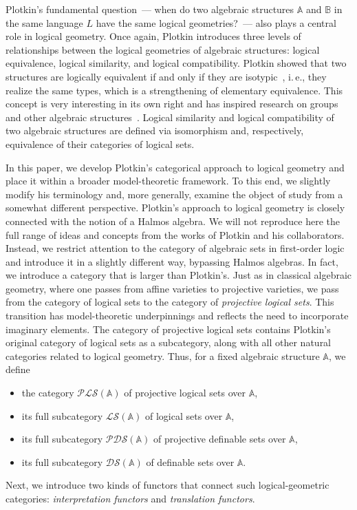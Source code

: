 \documentclass[12pt]{article}
\theoremstyle{definition}
\def\MA{{\mathbb{A}}}
\def\MB{{\mathbb{B}}}
\def\PLS{{\mathcal{PLS}}}
\def\PDS{{\mathcal{PDS}}}
\def\DS{{\mathcal{DS}}}
\def\LS{{\mathcal{LS}}}
\begin{document}
Plotkin’s fundamental question~--- when do two algebraic structures $\MA$ and $\MB$ in the same language $L$ have the same logical geometries?~--- also plays a central role in logical geometry. Once again, Plotkin introduces three levels of relationships between the logical geometries of algebraic structures: logical equivalence, logical similarity, and logical compatibility. Plotkin showed that two structures are logically equivalent if and only if they are isotypic~\cite{Plotkin10}, i.\,e., they realize the same types, which is a strengthening of elementary equivalence. This concept is very interesting in its own right and has inspired research on groups and other algebraic structures~\cite{Bunina1, Gvozdevsky, MR}. Logical similarity and logical compatibility of two algebraic structures are defined via isomorphism and, respectively, equivalence of their categories of logical sets.

In this paper, we develop Plotkin’s categorical approach to logical geometry and place it within a broader model-theoretic framework. To this end, we slightly modify his terminology and, more generally, examine the object of study from a somewhat different perspective. Plotkin’s approach to logical geometry is closely connected with the notion of a Halmos algebra. We will not reproduce here the full range of ideas and concepts from the works of Plotkin and his collaborators. Instead, we restrict attention to the category of algebraic sets in first-order logic and introduce it in a slightly different way, bypassing Halmos algebras.
In fact, we introduce a category that is larger than Plotkin’s. Just as in classical algebraic geometry, where one passes from affine varieties to projective varieties, we pass from the category of logical sets to the category of {\em projective logical sets}. This transition has model-theoretic underpinnings and reflects the need to incorporate imaginary elements. The category of projective logical sets contains Plotkin’s original category of logical sets as a subcategory, along with all other natural categories related to logical geometry. Thus, for a fixed algebraic structure $\MA$, we define 
\begin{itemize}
    \item the category $\PLS(\MA)$ of projective logical sets over $\MA$,
    \item its full subcategory $\LS(\MA)$ of logical sets over $\MA$,
    \item its full subcategory $\PDS(\MA)$ of projective definable sets over $\MA$,
    \item its full subcategory $\DS(\MA)$ of definable sets over $\MA$.
\end{itemize}
Next, we introduce two kinds of functors that connect such logical-geometric categories: {\em interpretation functors} and {\em translation functors}.
\end{document}

